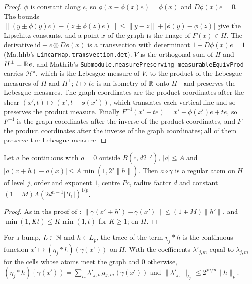 \begin{proof}
\leanok
$\phi$ is constant along $e$, so $\phi(x - \phi(x) e) = \phi(x)$ and $D\phi(x) e = 0$.
The bounds $\|(y \pm \phi(y) e) - (z \pm \phi(z) e)\| \leq \|y - z\| +
|\phi(y) - \phi(z)|$ give the Lipschitz constants, and a point $x$ of the graph is the image
of $F(x) \in H$.
The derivative $\mathrm{id} - e \otimes D\phi(x)$ is a transvection with determinant
$1 - D\phi(x) e = 1$ (Mathlib's \texttt{LinearMap.transvection.det}).
$V$ is the orthogonal sum of $H$ and $H^\perp = \mathbb{R} e$, and Mathlib's
\texttt{Submodule.\allowbreak measurePreserving\_\allowbreak measurableEquivProd} carries
$\mathcal H^n$, which is the Lebesgue measure of $V$, to the product of the Lebesgue measures of
$H$ and $H^\perp$; $t \mapsto t e$ is an isometry of $\mathbb{R}$ onto $H^\perp$ and preserves the
Lebesgue measures. The graph coordinates are the product coordinates after the shear
$(x', t) \mapsto (x', t + \phi(x'))$, which translates each vertical line and so preserves the
product measure. Finally $F^{-1}(x' + t e) = x' + \phi(x') e + t e$, so $F^{-1}$ is the graph
coordinates after the inverse of the product coordinates, and $F$ the product coordinates after
the inverse of the graph coordinates; all of them preserve the Lebesgue measure.
\end{proof}

\begin{lemma}
\label{lem:atom-traces}
\leanok
{}
Let $a$ be continuous with $a = 0$ outside $\overline{B}(c, d 2^{-j})$, $|a| \leq A$ and
$|a(x + h) - a(x)| \leq A \min(1, 2^j \|h\|)$. Then $a \circ \gamma$ is a regular atom on $H$ of
level $j$, order and exponent $1$, centre $Pc$, radius factor $d$ and constant
$(1 + M) A (2 d^{n-1} |B_1|)^{1/p}$.
\end{lemma}

\begin{proof}
\leanok
As in the proof of \cite[Theorem 4.2]{SchneiderVybiral}: $\|\gamma(x' + h') - \gamma(x')\| \leq
(1 + M) \|h'\|$, and $\min(1, K t) \leq K \min(1, t)$ for $K \geq 1$;  on
$H$.
\end{proof}

\begin{definition}
\label{def:trace-terms}
\leanok
{}
For a bump, $L \in \mathbb{N}$ and $h \in L_p$, the trace of the term $\eta_j * h$ is the continuous
function $x' \mapsto (\eta_j * h)(\gamma(x'))$ on $H$. With the coefficients $\lambda'_{j,m}$ equal
to $\lambda_{j,m}$ for the cells whose atoms meet the graph and $0$ otherwise,
$(\eta_j * h)(\gamma(x')) = \sum_m \lambda'_{j,m} a_{j,m}(\gamma(x'))$ and
$\|\lambda'_{j,\cdot}\|_{\ell_p} \leq 2^{jn/p} \|h\|_p$.
\end{definition}

